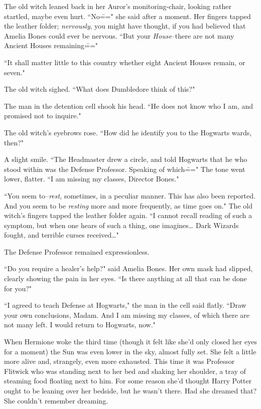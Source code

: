 The old witch leaned back in her Auror's monitoring-chair, looking rather startled, maybe even hurt. ``No\===" she said after a moment. Her fingers tapped the leather folder; \emph{nervously}, you might have thought, if you had believed that Amelia Bones could ever be nervous. ``But your \emph{House}\---there are not many Ancient Houses remaining\==="

``It shall matter little to this country whether eight Ancient Houses remain, or seven."

The old witch sighed. ``What does Dumbledore think of this?"

The man in the detention cell shook his head. ``He does not know who I am, and promised not to inquire."

The old witch's eyebrows rose. ``How did he identify you to the Hogwarts wards, then?"

A slight smile. ``The Headmaster drew a circle, and told Hogwarts that he who stood within was the Defense Professor. Speaking of which\===" The tone went lower, flatter. ``I am missing my classes, Director Bones."

``You seem to\---\emph{rest}, sometimes, in a peculiar manner. This has also been reported. And you seem to be \emph{resting} more and more frequently, as time goes on." The old witch's fingers tapped the leather folder again. ``I cannot recall reading of such a symptom, but when one hears of such a thing, one imagines{\ldots} Dark Wizards fought, and terrible curses received{\ldots}"

The Defense Professor remained expressionless.

``Do you require a healer's help?" said Amelia Bones. Her own mask had slipped, clearly showing the pain in her eyes. ``Is there anything at all that can be done for you?"

``I agreed to teach Defense at Hogwarts," the man in the cell said flatly. ``Draw your own conclusions, Madam. And I am missing my classes, of which there are not many left. I would return to Hogwarts, now."

\later

When Hermione woke the third time (though it felt like she'd only closed her eyes for a moment) the Sun was even lower in the sky, almost fully set. She felt a little more alive and, strangely, even more exhausted. This time it was Professor Flitwick who was standing next to her bed and shaking her shoulder, a tray of steaming food floating next to him. For some reason she'd thought Harry Potter ought to be leaning over her bedside, but he wasn't there. Had she dreamed that? She couldn't remember dreaming.

